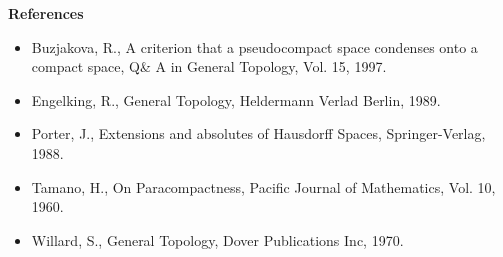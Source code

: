 \documentclass{article}
\begin{document}
\begin{center}
\textbf{References}
\end{center}

\vskip 30pt

\begin{itemize}
	\item Buzjakova, R., A criterion that a pseudocompact space condenses onto a compact space, Q\& A in General Topology, Vol. 15, 1997.
	\item Engelking, R., General Topology, Heldermann Verlad Berlin, 1989.
	\item Porter, J., Extensions and absolutes of Hausdorff Spaces, Springer-Verlag, 1988.
	\item Tamano, H., On Paracompactness, Pacific Journal of Mathematics, Vol. 10, 1960. 
	\item Willard, S., General Topology, Dover Publications Inc, 1970.
\end{itemize}
\end{document}
